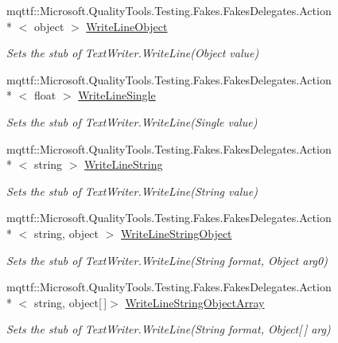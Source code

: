 \begin{DoxyCompactItemize}
mqttf\-::\-Microsoft.\-Quality\-Tools.\-Testing.\-Fakes.\-Fakes\-Delegates.\-Action\\*
$<$ object $>$ \hyperlink{class_system_1_1_i_o_1_1_fakes_1_1_stub_text_writer_a7fa6292c8ed88f2f316e22b2b23b49ad}{Write\-Line\-Object}
\begin{DoxyCompactList}\small\item\em Sets the stub of Text\-Writer.\-Write\-Line(\-Object value)\end{DoxyCompactList}\item 
mqttf\-::\-Microsoft.\-Quality\-Tools.\-Testing.\-Fakes.\-Fakes\-Delegates.\-Action\\*
$<$ float $>$ \hyperlink{class_system_1_1_i_o_1_1_fakes_1_1_stub_text_writer_ad619ce7db23ed41b4243fea4cc2dc38a}{Write\-Line\-Single}
\begin{DoxyCompactList}\small\item\em Sets the stub of Text\-Writer.\-Write\-Line(\-Single value)\end{DoxyCompactList}\item 
mqttf\-::\-Microsoft.\-Quality\-Tools.\-Testing.\-Fakes.\-Fakes\-Delegates.\-Action\\*
$<$ string $>$ \hyperlink{class_system_1_1_i_o_1_1_fakes_1_1_stub_text_writer_a8d82fc9c71762cbc1110e316625bc7fa}{Write\-Line\-String}
\begin{DoxyCompactList}\small\item\em Sets the stub of Text\-Writer.\-Write\-Line(\-String value)\end{DoxyCompactList}\item 
mqttf\-::\-Microsoft.\-Quality\-Tools.\-Testing.\-Fakes.\-Fakes\-Delegates.\-Action\\*
$<$ string, object $>$ \hyperlink{class_system_1_1_i_o_1_1_fakes_1_1_stub_text_writer_a639e31a00cdec93c8a83ff54b6cfc62c}{Write\-Line\-String\-Object}
\begin{DoxyCompactList}\small\item\em Sets the stub of Text\-Writer.\-Write\-Line(\-String format, Object arg0)\end{DoxyCompactList}\item 
mqttf\-::\-Microsoft.\-Quality\-Tools.\-Testing.\-Fakes.\-Fakes\-Delegates.\-Action\\*
$<$ string, object\mbox{[}$\,$\mbox{]}$>$ \hyperlink{class_system_1_1_i_o_1_1_fakes_1_1_stub_text_writer_a587abb0dc56db4913b54eea97c67c7d6}{Write\-Line\-String\-Object\-Array}
\begin{DoxyCompactList}\small\item\em Sets the stub of Text\-Writer.\-Write\-Line(\-String format, Object\mbox{[}$\,$\mbox{]} arg)\end{DoxyCompactList}\item 

\end{DoxyCompactItemize}
